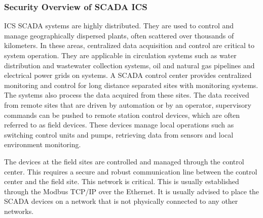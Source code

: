 \documentclass[article,msc=informatik,type=msc,colorback,accentcolor=tud9c]{tudthesis}
\begin{document}
	\subsubsection{Security Overview of SCADA ICS}\label{Security Perspective of SCADA ICS}

	\ac{ICS} \ac{SCADA} systems are highly distributed. They are used to control and manage geographically dispersed plants, often scattered over thousands of kilometers. In these areas, centralized data acquisition and control are critical to system operation. They are applicable in circulation systems such as water distribution and wastewater collection systems, oil and natural gas pipelines and electrical power grids on systems. A \ac{SCADA} control center provides centralized monitoring and control for long distance separated sites with monitoring systems. The systems also process the data acquired from these sites. The data received from remote sites that are driven by automation or by an operator,  supervisory commands can be pushed to remote station control devices, which are often referred to as field devices. These devices manage local operations such as switching control units and pumps, retrieving data from sensors and local environment monitoring.
	
	\vspace{3mm}
	
	The devices at the field sites are controlled and managed through the control center. This requires a secure and robust communication line between the control center and the field site. This network is critical. This is usually established through the Modbus TCP/IP over the Ethernet. It is usually advised \cite{stouffer2011guide} to place the \ac{SCADA} devices on a network that is not physically connected to any other networks. 
		
\end{document}
